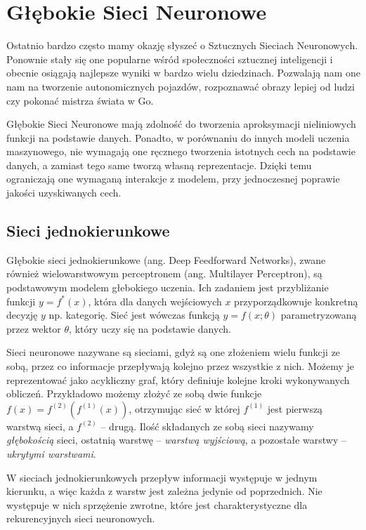 \documentclass[licencjacka]{pracamgr}
\begin{document}
\chapter{Głębokie Sieci Neuronowe}

Ostatnio bardzo często mamy okazję słyszeć o Sztucznych Sieciach Neuronowych. Ponownie stały się one popularne wśród społeczności sztucznej inteligencji i obecnie osiągają najlepsze wyniki w bardzo wielu dziedzinach. Pozwalają nam one nam na tworzenie autonomicznych pojazdów, rozpoznawać obrazy lepiej od ludzi czy pokonać mistrza świata w Go. 

Głębokie Sieci Neuronowe mają zdolność do tworzenia aproksymacji nieliniowych funkcji na podstawie danych. Ponadto, w porównaniu do innych modeli uczenia maszynowego, nie wymagają one ręcznego tworzenia istotnych cech na podstawie danych, a zamiast tego same tworzą własną reprezentacje. Dzięki temu ograniczają one wymaganą interakcje z modelem, przy jednoczesnej poprawie jakości uzyskiwanych cech.

\section{Sieci jednokierunkowe}

Głębokie sieci jednokierunkowe (ang. Deep Feedforward Networks), zwane również wielowarstwowym perceptronem (ang. Multilayer Perceptron), są podstawowym modelem głebokiego uczenia. Ich zadaniem jest przybliżanie funkcji $ y = f^{\ast}(x) $, która dla danych wejściowych $x$ przyporządkowuje konkretną decyzję $y$ np. kategorię. Sieć jest wówczas funkcją $ y = f(x; \theta) $ parametryzowaną przez wektor $\theta$, który uczy się na podstawie danych.

Sieci neuronowe nazywane są sieciami, gdyż są one złożeniem wielu funkcji ze sobą, przez co informacje przepływają kolejno przez wszystkie z nich. Możemy je reprezentować jako acykliczny graf, który definiuje kolejne kroki wykonywanych obliczeń. Przykładowo możemy złożyć ze sobą dwie funkcje $ f(x) = f^{(2)}(f^{(1)}(x)) $, otrzymując sieć w której $f^{(1)} $ jest pierwszą warstwą sieci, a $ f^{(2)} $ -- drugą. Ilość składanych ze sobą sieci nazywamy \emph{głębokością} sieci, ostatnią warstwę -- \emph{warstwą wyjściową}, a pozostałe warstwy -- \emph{ukrytymi warstwami}. 

W sieciach jednokierunkowych przepływ informacji występuje w jednym kierunku, a więc każda z warstw jest zależna jedynie od poprzednich. Nie występuje w nich sprzężenie zwrotne, które jest charakterystyczne dla rekurencyjnych sieci neuronowych.
\end{document}
